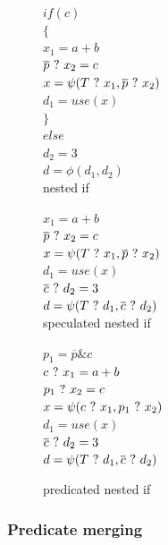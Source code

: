 \begin{figure}
\footnotesize
\begin{minipage}[b]{4cm}
$ if (c) $ \\
$ \{ $ \\
\hspace*{2mm}$ x_1 = a + b $ \\
\hspace*{2mm}$ \overline{p} ~?~ x_2 = c $ \\
\hspace*{2mm}$ x = \psi(T ~?~ x_1, \overline{p} ~?~ x_2) $ \\
\hspace*{2mm}$ d_1 = use (x) $ \\
$ \} $ \\
$ else $ \\
\hspace*{2mm}$ d_2 = 3 $ \\
$ d = \phi(d_1,d_2) $ \\
\caption{nested if}
\label{fig:nested_psi}
\end{minipage}
\begin{minipage}[b]{4cm}
$ x_1 = a + b $ \\
$ \overline{p} ~?~ x_2 = c $ \\
$ x = \psi(T ~?~ x_1, \overline{p} ~?~ x_2) $ \\
$ d_1 = use (x) $ \\
$ \overline{c} ~?~ d_2 = 3 $ \\
$ d = \psi(T ~?~ d_1, \overline{c} ~?~ d_2) $ \\
\caption{speculated nested if}
\label{fig:nested_psi_speculated}
\end{minipage}
\begin{minipage}[b]{4cm}
$ p_1 = \overline{p} \& {c} $ \\
$ c ~?~ x_1 = a + b $ \\
$ p_1 ~?~ x_2 = c $ \\
$ x = \psi(c ~?~ x_1, p_1 ~?~ x_2) $ \\
$ d_1 = use (x) $ \\
$ \overline{c} ~?~ d_2 = 3 $ \\
$ d = \psi(T ~?~ d_1, \overline{c} ~?~ d_2) $ \\
\caption{predicated nested if}
\label{fig:nested_psi_predicated}
\end{minipage}
\end{figure}

\subsubsection{Predicate merging}

